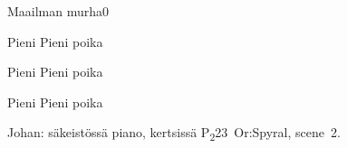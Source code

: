 \documentclass[11pt,a4paper]{article}
\begin{document}
\begin{mysong}{Maailman murha}{0}
\begin{SBChorus}
  Pieni     Pieni poika
    
\end{SBChorus}


\begin{SBChorus}
  Pieni     Pieni poika
    
\end{SBChorus}


\begin{SBChorus}
  Pieni     Pieni poika
    
\end{SBChorus}


{\SBLyricNoteFont Johan: säkeistössä piano, kertsissä
P\textsubscript{2}23~Or:Spyral, scene~2.}

\end{mysong}
\end{document}
